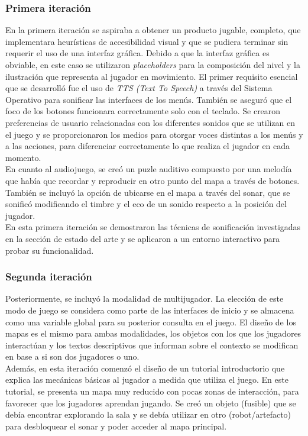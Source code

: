 \subsubsection{Primera iteración}
En la primera iteración se aspiraba a obtener un producto jugable, completo, que implementara heurísticas de accesibilidad visual y que se pudiera terminar sin requerir el uso de una interfaz gráfica.
Debido a que la interfaz gráfica es obviable, en este caso se utilizaron \textit{placeholders} para la composición del nivel y la ilustración que representa al jugador en movimiento. El primer requisito esencial que se desarrolló fue el uso de \textit{TTS (Text To Speech)} a través del Sistema Operativo para sonificar las interfaces de los menús. También se aseguró que el foco de los botones funcionara correctamente solo con el teclado. Se crearon preferencias de usuario relacionadas con los diferentes sonidos que se utilizan en el juego y se proporcionaron los medios para otorgar voces distintas a los menús y a las acciones, para diferenciar correctamente lo que realiza el jugador en cada momento.\\

En cuanto al audiojuego, se creó un puzle auditivo compuesto por una melodía que había que recordar y reproducir en otro punto del mapa a través de botones. También se incluyó la opción de ubicarse en el mapa a través del sonar, que se sonificó modificando el timbre y el eco de un sonido respecto a la posición del jugador.\\

En esta primera iteración se demostraron las técnicas de sonificación investigadas en la sección de estado del arte y se aplicaron a un entorno interactivo para probar su funcionalidad.\\
\subsubsection{Segunda iteración}
Posteriormente, se incluyó la modalidad de multijugador. La elección de este modo de juego se considera como parte de las interfaces de inicio y se almacena como una variable global para su posterior consulta en el juego. El diseño de los mapas es el mismo para ambas modalidades, los objetos con los que los jugadores interactúan y los textos descriptivos que informan sobre el contexto se modifican en base a si son dos jugadores o uno.\\

Además, en esta iteración comenzó el diseño de un tutorial introductorio que explica las mecánicas básicas al jugador a medida que utiliza el juego. En este tutorial, se presenta un mapa muy reducido con pocas zonas de interacción, para favorecer que los jugadores aprendan jugando. Se creó un objeto (fusible) que se debía encontrar explorando la sala y se debía utilizar en otro (robot/artefacto) para desbloquear el sonar y poder acceder al mapa principal. \\

